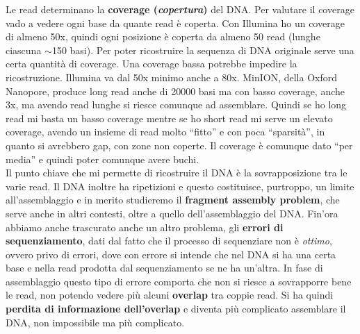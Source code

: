 \documentclass[a4paper,12pt, oneside]{book}
\begin{document}
Le read determinano la \textbf{coverage (\textit{copertura})} del DNA. Per
valutare il coverage vado a vedere ogni base da quante read è coperta. Con
Illumina ho un coverage di almeno 50x, quindi ogni posizione è coperta da almeno
50 read (lunghe ciascuna $\sim$150 basi). Per poter ricostruire la sequenza di
DNA originale serve una certa quantità di coverage. Una coverage bassa potrebbe
impedire la ricostruzione. Illumina va dal 50x minimo anche a 80x.
MinION, della Oxford Nanopore, produce long read anche di 20000 basi ma con
basso coverage, anche 3x, ma avendo read lunghe si riesce comunque ad
assemblare. Quindi se ho long read mi basta un basso coverage mentre se ho short
read mi serve un elevato coverage, avendo un insieme di read molto ``fitto'' e
con poca ``sparsità'', in quanto si avrebbero gap, con zone non coperte. Il
coverage è comunque dato ``per media'' e quindi poter comunque avere buchi.\\
Il punto chiave che mi permette di ricostruire il DNA è la sovrapposizione tra
le varie read. Il DNA inoltre ha ripetizioni e questo costituisce, purtroppo, un
limite all'assemblaggio e in merito studieremo il \textbf{fragment assembly
  problem}, che serve anche in altri contesti, oltre a quello dell'assemblaggio
del DNA. Fin'ora abbiamo anche trascurato anche un altro problema, gli
\textbf{errori di sequenziamento}, dati dal fatto che il processo di sequenziare
non è \textit{ottimo}, ovvero privo di errori, dove con errore si intende che
nel DNA si ha una certa base e nella read prodotta dal sequenziamento se ne ha
un'altra. In fase di assemblaggio questo tipo di errore comporta che non si
riesce a sovrapporre bene le read, non potendo vedere più alcuni
\textbf{overlap} tra coppie read. Si ha quindi \textbf{perdita di informazione
  dell'overlap} e diventa più complicato assemblare il DNA, non impossibile ma
più complicato.
\end{document}
